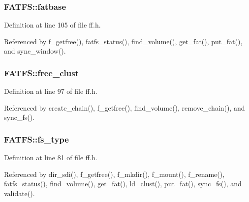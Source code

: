 \hypertarget{structFATFS_a848fba02c4aabe02ef2984e578f33d64}{
\subsubsection[{fatbase}]{ F\-A\-T\-F\-S\-::fatbase}}\label{structFATFS_a848fba02c4aabe02ef2984e578f33d64}


Definition at line 105 of file ff.\-h.



Referenced by f\-\_\-getfree(), fatfs\-\_\-status(), find\-\_\-volume(), get\-\_\-fat(), put\-\_\-fat(), and sync\-\_\-window().

\hypertarget{structFATFS_a5fb49e6ac511bd97eaffdd636d0e4165}{
\subsubsection[{free\-\_\-clust}]{ F\-A\-T\-F\-S\-::free\-\_\-clust}}\label{structFATFS_a5fb49e6ac511bd97eaffdd636d0e4165}


Definition at line 97 of file ff.\-h.



Referenced by create\-\_\-chain(), f\-\_\-getfree(), find\-\_\-volume(), remove\-\_\-chain(), and sync\-\_\-fs().

\hypertarget{structFATFS_add27d97babe807b573eac98a71dc4ae5}{
\subsubsection[{fs\-\_\-type}]{ F\-A\-T\-F\-S\-::fs\-\_\-type}}\label{structFATFS_add27d97babe807b573eac98a71dc4ae5}


Definition at line 81 of file ff.\-h.



Referenced by dir\-\_\-sdi(), f\-\_\-getfree(), f\-\_\-mkdir(), f\-\_\-mount(), f\-\_\-rename(), fatfs\-\_\-status(), find\-\_\-volume(), get\-\_\-fat(), ld\-\_\-clust(), put\-\_\-fat(), sync\-\_\-fs(), and validate().

